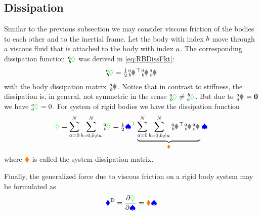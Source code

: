 \subsection{Dissipation}
Similar to the previous subsection we may consider viscous friction of the bodies to each other and to the inertial frame.
Let the body with index $\BidxII$ move through a viscous fluid that is attached to the body with index $\BidxI$.
The corresponding dissipation function $\bodyDissFkt{\BidxI}{\BidxII}$ was derived in \eqref{eq:RBDissFkt}:
\begin{align}
 \bodyDissFkt{\BidxI}{\BidxII} = \tfrac{1}{2} \bodyVel{\BidxI}{\BidxII}^\top \bodyDissMat{\BidxI}{\BidxII} \bodyVel{\BidxI}{\BidxII}
\end{align}
with the body dissipation matrix $\bodyDissMat{\BidxI}{\BidxII}$.
Notice that in contrast to stiffness, the dissipation is, in general, not symmetric in the sense $\bodyDissFkt{\BidxI}{\BidxII} \neq \bodyDissFkt{\BidxII}{\BidxI}$.
But due to $\bodyVel{\BidxI}{\BidxI} = \tuple{0}$ we have $\bodyDissFkt{\BidxI}{\BidxI}=0$.
For system of rigid bodies we have the dissipation function
\begin{align}
 \dissFkt = \sum_{\BidxI=0}^{\numRigidBodies} \sum_{\BidxII=0, \BidxII\neq\BidxI}^{\numRigidBodies} \bodyDissFkt{\BidxI}{\BidxII}
 = \tfrac{1}{2} \sysVel^\top \underbrace{\sum_{\BidxI=0}^{\numRigidBodies} \sum_{\BidxII=0, \BidxII\neq\BidxI}^{\numRigidBodies} \bodyJac{\BidxI}{\BidxII}^\top \bodyDissMat{\BidxI}{\BidxII} \bodyJac{\BidxI}{\BidxII}}_{\sysDissMat} \sysVel
\end{align}
where $\sysDissMat$ is called the system dissipation matrix.

Finally, the generalized force due to viscous friction on a rigid body system may be formulated as
\begin{align}
 \genForceDiss = \pdiff[\dissFkt]{\sysVel} = \sysDissMat \sysVel
\end{align}

